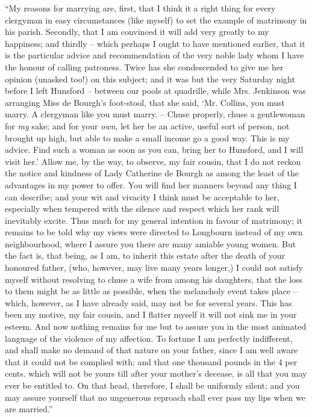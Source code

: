 “My reasons for marrying are, first, that I think it
a right thing for every clergyman in easy circumstances
(like myself) to set the example of matrimony in his
parish. Secondly, that I am convinced it will add very
greatly to my happiness; and thirdly -- which perhaps
I ought to have mentioned earlier, that it is the particular
advice and recommendation of the very noble lady whom
I have the honour of calling patroness. Twice has she
condescended to give me her opinion (unasked too!) on
this subject; and it was but the very Saturday night
before I left Hunsford -- between our pools at quadrille,
while Mrs. Jenkinson was arranging Miss de Bourgh’s
foot-stool, that she said, ‘Mr. Collins, you must marry.
A clergyman like you must marry. -- Chuse properly, chuse
a gentlewoman for \textit{my} sake; and for your \textit{own}, let her
be an active, useful sort of person, not brought up high,
but able to make a small income go a good way. This is
my advice. Find such a woman as soon as you can, bring
her to Hunsford, and I will visit her.’ Allow me, by the
way, to observe, my fair cousin, that I do not reckon
the notice and kindness of Lady Catherine de Bourgh
as among the least of the advantages in my power to
offer. You will find her manners beyond any thing I can
describe; and your wit and vivacity I think must be
acceptable to her, especially when tempered with the
silence and respect which her rank will inevitably excite.
Thus much for my general intention in favour of matrimony;
it remains to be told why my views were directed
to Longbourn instead of my own neighbourhood, where
I assure you there are many amiable young women.
But the fact is, that being, as I am, to inherit this estate
after the death of your honoured father, (who, however,
may live many years longer,) I could not satisfy myself
without resolving to chuse a wife from among his daughters,
that the loss to them might be as little as possible, when
the melancholy event takes place -- which, however, as
I have already said, may not be for several years. This
has been my motive, my fair cousin, and I flatter myself
it will not sink me in your esteem. And now nothing
remains for me but to assure you in the most animated
language of the violence of my affection. To fortune I am
perfectly indifferent, and shall make no demand of that
nature on your father, since I am well aware that it could
not be complied with; and that one thousand pounds
in the 4 per cents. which will not be yours till after your
mother’s decease, is all that you may ever be entitled to.
On that head, therefore, I shall be uniformly silent; and
you may assure yourself that no ungenerous reproach
shall ever pass my lips when we are married.”

